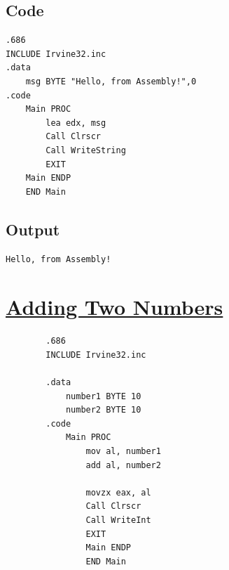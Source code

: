 \documentclass[12pt]{article}
\begin{document}
\subsection{Code}
\begin{tcolorbox}[colback=white,colframe=black,title=Hello World Program]
\begin{verbatim}
.686
INCLUDE Irvine32.inc 
.data
    msg BYTE "Hello, from Assembly!",0
.code
    Main PROC
        lea edx, msg
        Call Clrscr
        Call WriteString
        EXIT
    Main ENDP
    END Main
\end{verbatim}
\end{tcolorbox}

\subsection{Output}
\begin{tcolorbox}[colback=white,colframe=black,title=Output]
\begin{verbatim}
Hello, from Assembly!
\end{verbatim}
\end{tcolorbox}

\section{\underline{Adding Two Numbers}}

\begin{tcolorbox}[colback=white,colframe=black,title=Hello World Program]
    \begin{verbatim}
        .686
        INCLUDE Irvine32.inc 

        .data
            number1 BYTE 10
            number2 BYTE 10
        .code
            Main PROC
                mov al, number1
                add al, number2

                movzx eax, al
                Call Clrscr
                Call WriteInt
                EXIT
                Main ENDP
                END Main
    \end{verbatim}
\end{tcolorbox}
\end{document}
